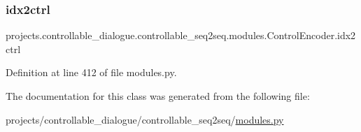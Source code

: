 \subsubsection{\texorpdfstring{idx2ctrl}{idx2ctrl}}
{\footnotesize\ttfamily projects.\+controllable\+\_\+dialogue.\+controllable\+\_\+seq2seq.\+modules.\+Control\+Encoder.\+idx2ctrl}



Definition at line 412 of file modules.\+py.



The documentation for this class was generated from the following file\+:\begin{DoxyCompactItemize}
\item 
projects/controllable\+\_\+dialogue/controllable\+\_\+seq2seq/\hyperlink{projects_2controllable__dialogue_2controllable__seq2seq_2modules_8py}{modules.\+py}\end{DoxyCompactItemize}
